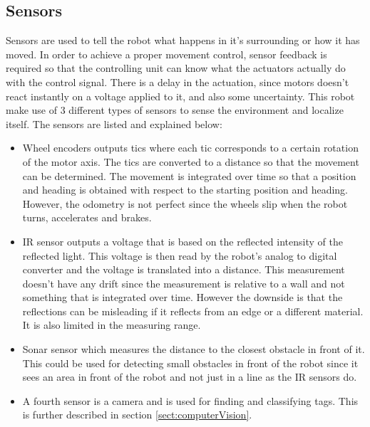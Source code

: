 \subsection{Sensors}

Sensors are used to tell the robot what happens in it's surrounding or how it has moved. 
In order to achieve a proper movement control, sensor feedback is required so that the controlling unit can know what the actuators actually do with the control signal. There is a delay in the actuation, since motors doesn't react instantly on a voltage applied to it, and also some uncertainty. This robot make use of 3 different types of sensors to sense the environment and localize itself. The sensors are listed and explained below:
\begin{itemize}
\item Wheel encoders outputs tics where each tic corresponds to a certain rotation of the motor axis. The tics are converted to a distance so that the movement can be determined. The movement is integrated over time so that a position and heading is obtained with respect to the starting position and heading. However, the odometry is not perfect since the wheels slip when the robot turns, accelerates and brakes. 

\item IR sensor outputs a voltage that is based on the reflected intensity of the reflected light. This voltage is then read by the robot's analog to digital converter and the voltage is translated into a distance. This measurement doesn't have any drift since the measurement is relative to a wall and not something that is integrated over time. However the downside is that the reflections can be misleading if it reflects from an edge or a different material. It is also limited in the measuring range.

\item Sonar sensor which measures the distance to the closest obstacle in front of it. This could be used for detecting small obstacles in front of the robot since it sees an area in front of the robot and not just in a line as the IR sensors do.

\item A fourth sensor is a camera and is used for finding and classifying tags. This is further described in section \ref{sect:computerVision}.

\end{itemize}